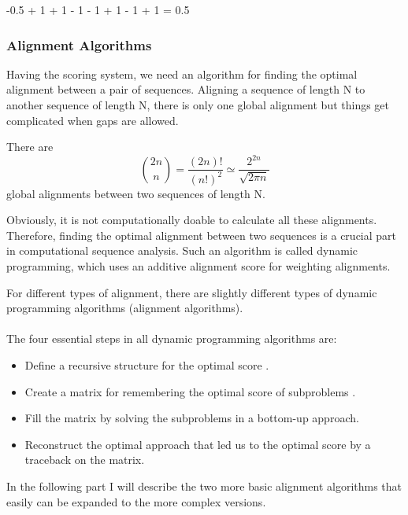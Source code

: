 \documentclass[11pt,a4paper]{report}
\begin{document}
-0.5 + 1 + 1 - 1 - 1 + 1 - 1 + 1 = 0.5




\subsubsection{Alignment Algorithms} \label{Alignment Algorithms}
Having the scoring system, we need an algorithm for finding the 
optimal alignment between a pair of sequences. 
Aligning a sequence of length N to another sequence of length N,
there is only one global alignment but things get complicated when 
gaps are allowed.
 
There are \cite{durbin}
$$ \binom{2n}{n} = \frac{(2n)!}{(n!)^2} \simeq \frac{2^{2n}}
{\sqrt{2\pi n}} $$
global alignments between two sequences of length N.

Obviously, it is not computationally doable to calculate all these
alignments. Therefore, finding the optimal alignment between two 
sequences is a crucial part in computational sequence analysis.
Such an algorithm is called dynamic programming, which uses an 
additive alignment score for  weighting alignments. 

For different types of alignment, there are slightly different 
types of dynamic programming algorithms (alignment algorithms).\\\\


The four essential steps in all dynamic programming algorithms are:

\begin{itemize} 
	\item Define a recursive structure for the optimal score
	\cite{eddydynamic}.
	\item  Create a  matrix for remembering the optimal score 
	of subproblems \cite{eddydynamic}.	
	\item Fill the matrix by solving the  subproblems in a 
	bottom-up approach\cite{eddydynamic}.
	\item Reconstruct the optimal approach that led us to the 
	optimal score by a traceback on the matrix\cite{eddydynamic}.
\end{itemize}

In the following part I will describe the two more basic alignment 
algorithms that easily can be expanded to the more complex versions.
\end{document}
